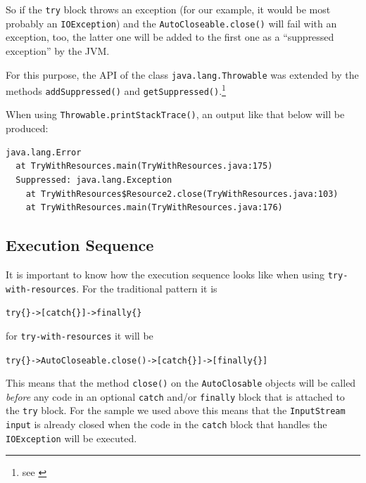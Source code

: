 \documentclass[11pt,a4paper, titlepage, parskip=half, headsepline, footsepline, cleardoublepage=current, headheight=1cm]{scrbook}
\begin{document}
So if the \lstinline|try| block throws an exception (for our example, it would be most probably an \lstinline|IOException|) and the \lstinline|AutoCloseable.close()| will fail with an exception, too, the latter one will be added to the first one as a “suppressed exception” by the JVM.

For this purpose, the API of the class \lstinline|java.lang.Throwable| was extended by the methods \lstinline|addSuppressed()| and \lstinline|getSuppressed()|.\footnote{see \autocite{ORACLE_DOC_THROWABLE_CLASS}}

When using \lstinline|Throwable.printStackTrace()|, an output like that below will be produced:
\begin{lstlisting}
java.lang.Error
  at TryWithResources.main(TryWithResources.java:175)
  Suppressed: java.lang.Exception
    at TryWithResources$Resource2.close(TryWithResources.java:103)
    at TryWithResources.main(TryWithResources.java:176)
\end{lstlisting}

\subsection{Execution Sequence}\label{sec:ExecutionSequence}
It is important to know how the execution sequence looks like when using \lstinline|try-with-resources|. For the traditional pattern it is\\
\begin{center}
\verb#try{}->[catch{}]->finally{}#
\end{center} 
for \lstinline|try-with-resources| it will be\\ 
\begin{center}
\verb#try{}->AutoCloseable.close()->[catch{}]->[finally{}]#
\end{center}

This means that the method \lstinline|close()| on the \lstinline|AutoClosable| objects will be called \textit{before} any code in an optional \lstinline|catch| and/or \lstinline|finally| block that is attached to the \lstinline|try| block. For the sample we used above this means that the \lstinline|InputStream input| is already closed when the code in the \lstinline|catch| block that handles the \lstinline|IOException| will be executed.
\end{document}
